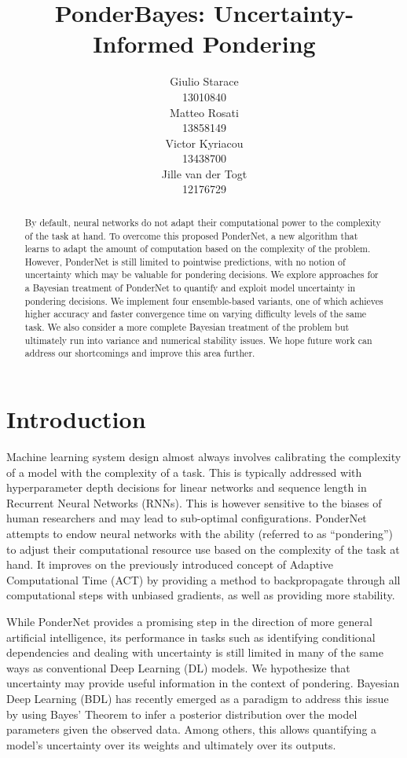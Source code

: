\documentclass{article}
\title{PonderBayes: Uncertainty-Informed Pondering}
\author{
  Giulio Starace \\
  13010840 \\
   \And
  Matteo Rosati \\
  13858149\\
   \AND
  Victor Kyriacou \\
  13438700\\
   \And
  Jille van der Togt\\
  12176729\\
}
\begin{document}
\maketitle


\begin{abstract}

By default, neural networks do not adapt their computational power to the complexity of the task at hand. To overcome this \citet{banino_pondernet_2021} proposed PonderNet, a new algorithm that learns to adapt the amount of computation based on the complexity of the problem. However, PonderNet is still limited to pointwise predictions, with no notion of uncertainty which may be valuable for pondering decisions. We explore approaches for a Bayesian treatment of PonderNet to quantify and exploit model uncertainty in pondering decisions. We implement four ensemble-based variants, one of which achieves higher accuracy and faster convergence time on varying difficulty levels of the same task. We also consider a more complete Bayesian treatment of the problem but ultimately run into variance and numerical stability issues. We hope future work can address our shortcomings and improve this area further.
\end{abstract}


\section{Introduction} \label{introduction}

Machine learning system design almost always involves calibrating the complexity of a model with the complexity of a task. This is typically addressed with hyperparameter depth decisions for linear networks and sequence length in Recurrent Neural Networks (RNNs). This is however sensitive to the biases of human researchers and may lead to sub-optimal configurations. PonderNet \citep{banino_pondernet_2021} attempts to endow neural networks with the ability (referred to as “pondering”) to adjust their computational resource use based on the complexity of the task at hand. It improves on the previously introduced concept of Adaptive Computational Time (ACT) \citep{graves_adaptive_2017} by providing a method to backpropagate through all computational steps with unbiased gradients, as well as providing more stability.

While PonderNet provides a promising step in the direction of more general artificial intelligence, its performance in tasks such as identifying conditional dependencies and dealing with uncertainty is still limited in many of the same ways as conventional Deep Learning (DL) models. We hypothesize that uncertainty may provide useful information in the context of pondering. Bayesian Deep Learning (BDL) has recently emerged as a paradigm to address this issue \citep{murphy_machine_2012, blundell_weight_2015, louizos_multiplicative_2017, fortuin_priors_2022} by using Bayes' Theorem \citep{bayes_lii_1763} to infer a posterior distribution over the model parameters given the observed data. Among others, this allows quantifying a model's uncertainty over its weights and ultimately over its outputs.
\end{document}
